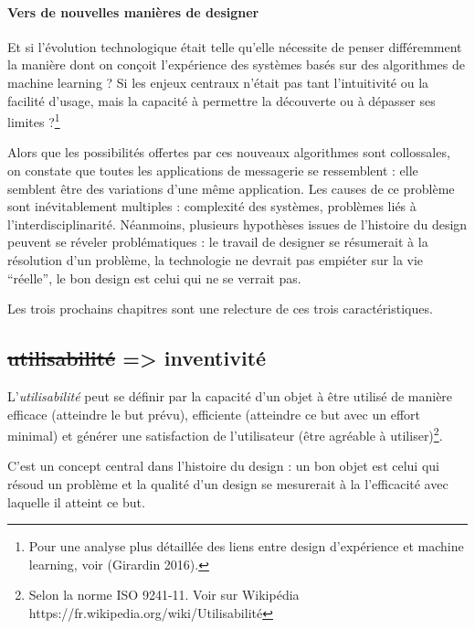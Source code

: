 \documentclass[]{article}
\let\oldparagraph\paragraph
\renewcommand{\paragraph}[1]{\oldparagraph{#1}\mbox{}}
\begin{document}
\hypertarget{vers-de-nouvelles-maniuxe8res-de-designer}{%
\paragraph{Vers de nouvelles manières de
designer}\label{vers-de-nouvelles-maniuxe8res-de-designer}}

Et si l'évolution technologique était telle qu'elle nécessite de penser
différemment la manière dont on conçoit l'expérience des systèmes basés
sur des algorithmes de machine learning ? Si les enjeux centraux n'était
pas tant l'intuitivité ou la facilité d'usage, mais la capacité à
permettre la découverte ou à dépasser ses limites ?\footnote{Pour une
  analyse plus détaillée des liens entre design d'expérience et machine
  learning, voir (Girardin 2016).}

Alors que les possibilités offertes par ces nouveaux algorithmes sont
collossales, on constate que toutes les applications de messagerie se
ressemblent : elle semblent être des variations d'une même application.
Les causes de ce problème sont inévitablement multiples : complexité des
systèmes, problèmes liés à l'interdisciplinarité. Néanmoins, plusieurs
hypothèses issues de l'histoire du design peuvent se réveler
problématiques : le travail de designer se résumerait à la résolution
d'un problème, la technologie ne devrait pas empiéter sur la vie
``réelle'', le bon design est celui qui ne se verrait pas.

Les trois prochains chapitres sont une relecture de ces trois
caractéristiques.

\newpage

\hypertarget{utilisabilituxe9-inventivituxe9}{%
\subsection{\texorpdfstring{\sout{utilisabilité} =\textgreater{}
inventivité}{utilisabilité =\textgreater{} inventivité}}\label{utilisabilituxe9-inventivituxe9}}

L'\emph{utilisabilité} peut se définir par la capacité d'un objet à être
utilisé de manière efficace (atteindre le but prévu), efficiente
(atteindre ce but avec un effort minimal) et générer une satisfaction de
l'utilisateur (être agréable à utiliser)\footnote{Selon la norme ISO
  9241-11. Voir sur Wikipédia
  https://fr.wikipedia.org/wiki/Utilisabilité}.

C'est un concept central dans l'histoire du design : un bon objet est
celui qui résoud un problème et la qualité d'un design se mesurerait à
la l'efficacité avec laquelle il atteint ce but.
\end{document}
